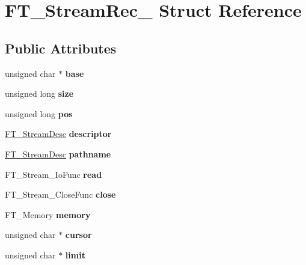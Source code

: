 \hypertarget{struct_f_t___stream_rec__}{}\section{F\+T\+\_\+\+Stream\+Rec\+\_\+ Struct Reference}
\label{struct_f_t___stream_rec__}
\subsection*{Public Attributes}
\begin{DoxyCompactItemize}
\item 
\mbox{\label{struct_f_t___stream_rec___a7b406cb9a60c5a8b4bd8d04b7a23cfee}} 
unsigned char $\ast$ {\bfseries base}
\item 
\mbox{\label{struct_f_t___stream_rec___ab00e3cf802c950d0ca5a022a06953123}} 
unsigned long {\bfseries size}
\item 
\mbox{\label{struct_f_t___stream_rec___a5bf82c2ff4554752edfeec442fba2f33}} 
unsigned long {\bfseries pos}
\item 
\mbox{\label{struct_f_t___stream_rec___a361c44020eace21cc453b51852d8cc4f}} 
\hyperlink{union_f_t___stream_desc__}{F\+T\+\_\+\+Stream\+Desc} {\bfseries descriptor}
\item 
\mbox{\label{struct_f_t___stream_rec___afd75c5de5ed78c484a200a7e97ef5a41}} 
\hyperlink{union_f_t___stream_desc__}{F\+T\+\_\+\+Stream\+Desc} {\bfseries pathname}
\item 
\mbox{\label{struct_f_t___stream_rec___af724049d0258d4988c2b11c3a08b1b05}} 
F\+T\+\_\+\+Stream\+\_\+\+Io\+Func {\bfseries read}
\item 
\mbox{\label{struct_f_t___stream_rec___a7d7c7a1d7de8f580d7ad66efe89defa9}} 
F\+T\+\_\+\+Stream\+\_\+\+Close\+Func {\bfseries close}
\item 
\mbox{\label{struct_f_t___stream_rec___a51e2be0d80d70b532aae3face5461e7e}} 
F\+T\+\_\+\+Memory {\bfseries memory}
\item 
\mbox{\label{struct_f_t___stream_rec___ab7dbbad87d8b6d0178771a06e1ce8b4d}} 
unsigned char $\ast$ {\bfseries cursor}
\item 
\mbox{\label{struct_f_t___stream_rec___aff006e6ee3bbc2741a2c4ae79b1bad3a}} 
unsigned char $\ast$ {\bfseries limit}
\end{DoxyCompactItemize}


